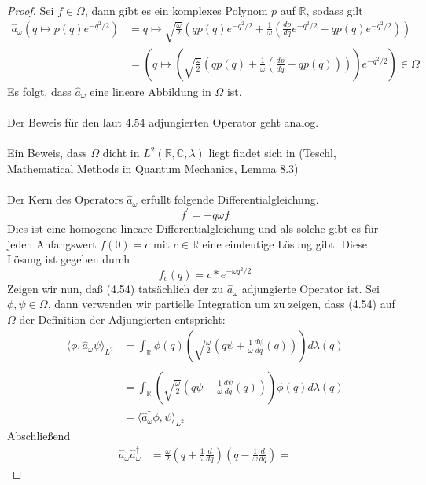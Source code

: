 \documentclass[11pt,a4paper,leqno]{report}
\numberwithin{equation}{chapter}
\begin{document}
\begin{proof}
	Sei $f\in\Omega$, dann gibt es ein komplexes Polynom $p$ auf $\mathbb{R}$, sodass gilt
	\begin{align*}
		\hat{a}_\omega (q\mapsto p(q)e^{-q^2/2}) &= q \mapsto \sqrt{\frac{\omega}{2}}(q p(q)e^{-q^2/2} +  \frac{1}{\omega}(\frac{dp}{dq}e^{-q^2/2} - q p(q)e^{-q^2/2}))\\&=(q \mapsto (\sqrt{\frac{\omega}{2}}(q p(q) +  \frac{1}{\omega}(\frac{dp}{dq} - q p(q))))e^{-q^2/2})\in \Omega
	\end{align*}
Es folgt, dass $\hat{a}_\omega$ eine lineare Abbildung in $\Omega$ ist. \\
\\
Der Beweis f\"ur den laut 4.54 adjungierten Operator geht analog.\\
\\
Ein Beweis, dass $\Omega$ dicht in $L^2(\mathbb{R}, \mathbb{C},\lambda)$ liegt findet sich in (Teschl, Mathematical Methods in Quantum Mechanics, Lemma 8.3)\\
\\
Der Kern des Operators $\hat{a}_\omega$ erf\"ullt folgende Differentialgleichung.
\begin{equation*}
	f^\prime=-q\omega f
\end{equation*}
Dies ist eine homogene lineare Differentialgleichung und als solche gibt es f\"ur jeden Anfangswert $f(0)=c$ mit $c\in \mathbb{R}$ eine eindeutige L\"osung gibt. Diese L\"osung ist gegeben durch
\begin{equation*}
	f_c(q) = c * e^{-\omega q^2 / 2}
\end{equation*}
Zeigen wir nun, da\ss{} (4.54) tats\"achlich der zu $\hat{a}_\omega$ adjungierte Operator ist.
Sei $\phi, \psi \in \Omega$, dann verwenden wir partielle Integration um zu zeigen, dass (4.54) auf $\Omega$ der Definition der Adjungierten entspricht:
\begin{align*}
	\langle \phi, \hat{a}_\omega\psi\rangle_{L^2} &= 
	\int_\mathbb{R} \overline{\phi}(q)( \sqrt{\frac{\omega}{2}}(q\psi +  \frac{1}{\omega}\frac{d\psi}{dq}(q)))d\lambda(q)\\&=
	\int_\mathbb{R} \overline{( \sqrt{\frac{\omega}{2}}(q\psi -  \frac{1}{\omega}\frac{d\psi}{dq}(q)))}\phi(q) d\lambda(q)\\&=\langle \hat{a}^\dagger_\omega\phi, \psi\rangle_{L^2}
\end{align*}
Abschlie\ss{}end
\begin{align*}
	\hat{a}_\omega\hat{a}_\omega^\dagger &= 
	\frac{\omega}{2}(q + \frac{1}{\omega}\frac{d}{dq})(q - \frac{1}{\omega}\frac{d}{dq})=

\end{align*}
\end{proof}
\end{document}
